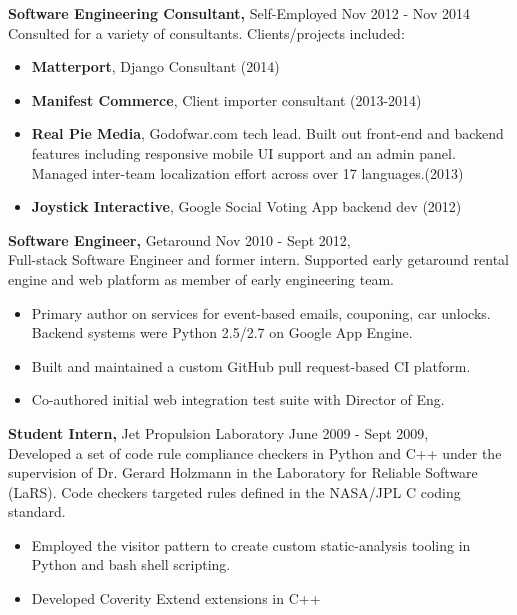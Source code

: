 \documentclass[margin]{res}
\begin{document}
\begin{resume}
  {\bf Software Engineering Consultant,} Self-Employed   \hfill Nov 2012 - Nov 2014\\
  Consulted for a variety of consultants.  Clients/projects included:
  \begin{itemize}
    \item {\bf Matterport}, Django Consultant (2014)
    \item {\bf Manifest Commerce}, Client importer consultant (2013-2014)
    \item {\bf Real Pie Media}, Godofwar.com tech lead.  Built out front-end and backend features including responsive mobile UI support and an admin panel.  Managed inter-team localization effort across over 17 languages.(2013)
    \item {\bf Joystick Interactive}, Google Social Voting App backend dev (2012)
  \end{itemize}

  {\bf Software Engineer,} Getaround \hfill Nov 2010 - Sept 2012, \\
  Full-stack Software Engineer and former intern.  Supported early getaround rental engine and web platform as member of early engineering team.
  \begin{itemize}
   \item Primary author on services for event-based emails, couponing, car unlocks.  Backend systems were Python 2.5/2.7 on Google App Engine.
    \item Built and maintained a custom GitHub pull request-based CI platform.
    \item Co-authored initial web integration test suite with Director of Eng.
  \end{itemize}


{\bf Student Intern,} Jet Propulsion Laboratory \hfill June 2009 - Sept 2009, \\
 Developed a set of code rule compliance checkers in Python and C++ under the supervision of Dr. Gerard Holzmann in the Laboratory for Reliable Software (LaRS).  Code checkers targeted rules defined in the NASA/JPL C coding standard.
 \begin{itemize}
 \item Employed the visitor pattern to create custom static-analysis tooling in Python and bash shell scripting.
 \item Developed Coverity Extend extensions in C++
 \end{itemize}


\end{resume}
\end{document}
